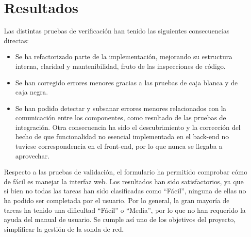 \section{Resultados\label{sec:pb:resultados}}

Las distintas pruebas de verificación han tenido las siguientes consecuencias directas:
\begin{itemize}
  \item Se ha refactorizado parte de la implementación, mejorando su estructura interna, claridad y mantenibilidad, fruto de las inspecciones de código.
  \item Se han corregido errores menores gracias a las pruebas de caja blanca y de caja negra.
  \item Se han podido detectar y subsanar errores menores relacionados con la comunicación entre los componentes, como resultado de las pruebas de integración.
Otra consecuencia ha sido el descubrimiento y la corrección del hecho de que funcionalidad no esencial implementada en el \gls{back-end} no tuviese correspondencia en el \gls{front-end}, por lo que nunca se llegaba a aprovechar.
\end{itemize}

Respecto a las pruebas de validación, el formulario ha permitido comprobar cómo de fácil es manejar la interfaz web.
Los resultados han sido satisfactorios, ya que si bien no todas las tareas han sido clasificadas como ``Fácil'', ninguna de ellas no ha podido ser completada por el usuario.
Por lo general, la gran mayoría de tareas ha tenido una dificultad ``Fácil'' o ``Media'', por lo que no han requerido la ayuda del manual de usuario.
Se cumple así uno de los objetivos del proyecto, simplificar la gestión de la sonda de red.
